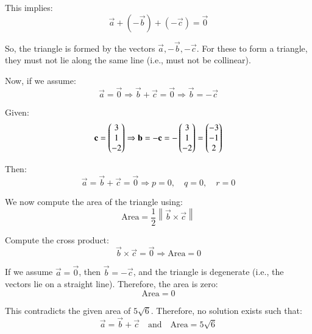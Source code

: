 \documentclass[journal]{IEEEtran}
\begin{document}
This implies:
\begin{equation}
\vec{a} + (-\vec{b}) + (-\vec{c}) = \vec{0}
\end{equation}

So, the triangle is formed by the vectors $\vec{a}, -\vec{b}, -\vec{c}$. For these to form a triangle, they must not lie along the same line (i.e., must not be collinear).

\vspace{1em}
Now, if we assume:
\begin{equation}
\vec{a} = \vec{0}
\Rightarrow \vec{b} + \vec{c} = \vec{0}
\Rightarrow \vec{b} = -\vec{c}
\end{equation}

Given:
\begin{equation}
\mathbf{c} = \begin{pmatrix}3 \\ 1 \\ -2\end{pmatrix} 
\Rightarrow \mathbf{b} = -\mathbf{c} = -\begin{pmatrix}3 \\ 1 \\ -2\end{pmatrix}
= \begin{pmatrix}-3 \\ -1 \\ 2\end{pmatrix}
\end{equation}

Then:
\begin{equation}
\vec{a} = \vec{b} + \vec{c} = \vec{0}
\Rightarrow p = 0,\quad q = 0,\quad r = 0
\end{equation}

We now compute the area of the triangle using:
\begin{equation}
\text{Area} = \frac{1}{2} \left\| \vec{b} \times \vec{c} \right\|
\end{equation}

Compute the cross product:
\begin{equation}
\vec{b} \times \vec{c} = \vec{0} \Rightarrow \text{Area} = 0
\end{equation}

If we assume $\vec{a} = \vec{0}$, then $\vec{b} = -\vec{c}$, and the triangle is degenerate (i.e., the vectors lie on a straight line). Therefore, the area is zero:
\begin{equation}
\boxed{\text{Area} = 0}
\end{equation}

This contradicts the given area of $5\sqrt{6}$. Therefore, no solution exists such that:
\begin{equation}
\vec{a} = \vec{b} + \vec{c} \quad \text{and} \quad \text{Area} = 5\sqrt{6}
\end{equation}
\end{document}
